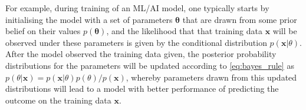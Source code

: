 For example, during training of an ML/AI model, one typically starts by initialising the model with a set of parameters $\mathbf{\theta}$ that are drawn from some prior belief on their values $p(\mathbf{\theta})$, and the likelihood that that training data $\bm{x}$ will be observed under these parameters is given by the conditional distribution $p(\bm{x}|\theta)$. After the model observed the training data given, the posterior probability distributions for the parameters will be updated according to \cref{eq:bayes_rule} as $p(\theta|\bm{x})=p(\bm{x}|\theta)p(\theta)/p(\bm{x})$, whereby parameters drawn from this updated distributions will lead to a model with better performance of predicting the outcome on the training data $\bm{x}$.
